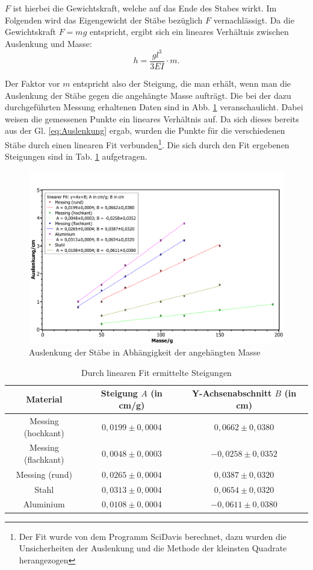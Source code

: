 	$F$ ist hierbei die Gewichtskraft, welche auf das Ende des Stabes wirkt. Im Folgenden wird das Eigengewicht der Stäbe bezüglich $F$ vernachlässigt.
	Da die Gewichtskraft $F = mg$ entspricht, ergibt sich ein lineares Verhältnis zwischen Auslenkung und Masse:
	\begin{equation}
	h = \frac{gl^3}{3EI}\cdot m. \label{eq:Auslenkung}
	\end{equation}
	
	Der Faktor vor $m$ entspricht also der Steigung, die man erhält, wenn man die Auslenkung der Stäbe gegen die angehängte Masse aufträgt. Die bei der dazu durchgeführten Messung erhaltenen Daten sind in Abb. \ref{abb:linearerFit} veranschaulicht.		
	Dabei weisen die gemessenen Punkte ein lineares Verhältnis auf. Da sich dieses bereits aus der Gl. \ref{eq:Auslenkung} ergab, wurden die Punkte für die verschiedenen Stäbe durch einen linearen Fit verbunden\footnote{Der Fit wurde von dem Programm SciDavis berechnet, dazu wurden die Unsicherheiten der Auslenkung und die Methode der kleinsten Quadrate herangezogen}. Die sich durch den Fit ergebenen Steigungen sind in Tab. \ref{tab:Steigungen} aufgetragen.
	\begin{figure}[ht]
		\centering
		\includegraphics[width=\textwidth]{StabAuslenkungen.pdf}
		\caption{Auslenkung der Stäbe in Abhängigkeit der angehängten Masse}
		\label{abb:linearerFit}	
	\end{figure}
	\begin{table}[ht]
		\caption{Durch linearen Fit ermittelte Steigungen}
		\centering
		\label{tab:Steigungen}
		\begin{tabular}{c|c|c}
			{Material} & {Steigung $A$ (in cm/g)} & {Y-Achsenabschnitt $B$ (in cm)} \\
			\hline
			{Messing (hochkant)} & {$0,0199\pm 0,0004$} & {$0,0662\pm 0,0380$} \\
			{Messing (flachkant)} & {$0,0048\pm 0,0003$} & {$-0,0258\pm 0,0352$} \\
			{Messing (rund)} & {$0,0265\pm 0,0004$} & {$0,0387\pm 0,0320$} \\
			{Stahl} & {$0,0313\pm 0,0004$} & {$0,0654\pm 0,0320$} \\
			{Aluminium} & {$0,0108\pm 0,0004$} & {$-0,0611\pm 0,0380$} \\	
		\end{tabular}
	\end{table}
	
